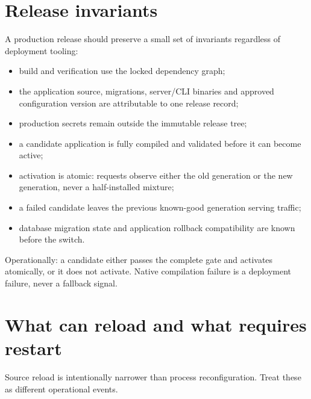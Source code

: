 \section{Release invariants}

A production release should preserve a small set of invariants regardless of deployment tooling:

\begin{itemize}
  \item build and verification use the locked dependency graph;
  \item the application source, migrations, server/CLI binaries and approved configuration version are attributable to one release record;
  \item production secrets remain outside the immutable release tree;
  \item a candidate application is fully compiled and validated before it can become active;
  \item activation is atomic: requests observe either the old generation or the new generation, never a half-installed mixture;
  \item a failed candidate leaves the previous known-good generation serving traffic;
  \item database migration state and application rollback compatibility are known before the switch.
\end{itemize}

Operationally: a candidate either passes the complete gate and activates atomically, or it does not activate. Native compilation failure is a deployment failure, never a fallback signal.

\section{What can reload and what requires restart}

Source reload is intentionally narrower than process reconfiguration. Treat these as different operational events.

